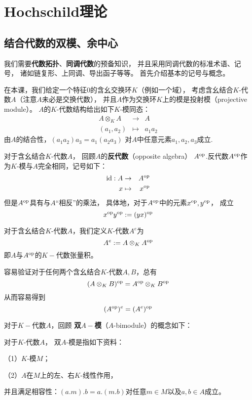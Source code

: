 \chapter{Hochschild理论}

\section{结合代数的双模、余中心}

我们需要\textbf{代数拓扑}、\textbf{同调代数}的预备知识，
并且采用同调代数的标准术语、记号，
诸如链复形、上同调、导出函子等等。
首先介绍基本的记号与概念。

在本课，我们给定一个特征$0$的含幺交换环$K$（例如一个域），
考虑含幺结合$K$-代数$A$（注意$A$未必是交换代数），
并且$A$作为交换环$K$上的模是投射模（projective module）。
$A$的$K$-代数结构给出如下$K$-模同态：
\begin{eqnarray*}
A\otimes_KA        &\rightarrow& A\\
(a_1,a_2)          &\mapsto    & a_1a_2
\end{eqnarray*}
由$A$的结合性，$(a_1a_2)a_3=a_1(a_2a_3)$
对$A$中任意元素$a_1,a_2,a_3$成立.

对于含幺结合$K$-代数$A$，
回顾$A$的\textbf{反代数}（opposite algebra）
$A^{\text{op}}$.反代数$A^{\text{op}}$作为$K$-模与$A$完全相同，记号如下：
\begin{eqnarray*}
\text{id}:A &\rightarrow & A^{\text{op}}\\
x&\mapsto&x^{\text{op}}
\end{eqnarray*}
但是$A^{\text{op}}$具有与$A$“相反”的乘法，
具体地，对于$A^{\text{op}}$中的元素$x^{\text{op}},y^{\text{op}}$，
成立
$$x^{\text{op}} y^{\text{op}}:=(yx)^{\text{op}}$$

\begin{definition}
对于含幺结合$K$-代数$A$，我们定义$K$-代数$A^e$为
$$A^e:=A\otimes_K A^{\text{op}}$$
即$A$与$A^{\text{op}}$的$K-$代数张量积。
\end{definition}

容易验证对于任何两个含幺结合$K$-代数$A,B$，总有
$$(A\otimes_K B)^{\text{op}}=A^{\text{op}}\otimes_{K}B^{\text{op}}$$
从而容易得到
$$(A^{\text{op}})^e=(A^e)^{\text{op}}$$

对于$K-$代数$A$，回顾
\textbf{双$A-$模}（$A$-bimodule）的概念如下：

\begin{definition}对于$K$-代数$A$，
双$A$-模是指如下资料：

（1）$K$-模$M$；

（2）$A$在$M$上的左、右$K$-线性作用，

并且满足相容性：$(a.m).b=a.(m.b)$对任意$m\in M$以及$a,b\in A$成立。
\end{definition}

